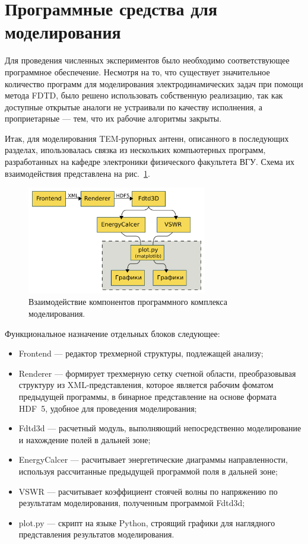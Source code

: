 
\section{Программные средства для моделирования}

Для проведения численных экспериментов было необходимо соответствующее
программное обеспечение. Несмотря на то, что существует значительное количество
программ для моделирования электродинамических задач при помощи метода FDTD,
было решено использовать собственную реализацию, так как доступные открытые
аналоги не устраивали по качеству исполнения, а проприетарные --- тем, что
их рабочие алгоритмы закрыты.

Итак, для моделирования TEM-рупорных антенн, описанного в последующих разделах,
ипользовалась связка из нескольких компьютерных программ, разработанных на
кафедре электроники физического факультета ВГУ. Схема их взаимодействия
представлена на рис.~\ref{fig:Programs:WorkFlow}.

\begin{figure}[p]
\centering
\includegraphics[width=0.7\textwidth]{graphics/programs-work-flow}
\caption{Взаимодействие компонентов программного комплекса моделирования.}
\label{fig:Programs:WorkFlow}
\end{figure}

Функциональное назначение отдельных блоков следующее:
\begin{itemize}
\item Frontend --- редактор трехмерной структуры, подлежащей анализу;
\item Renderer --- формирует трехмерную сетку счетной области, преобразовывая
      структуру из XML-представления, которое является рабочим фоматом
      предыдущей программы, в бинарное представление на основе формата HDF~5,
      удобное для проведения моделирования;
\item Fdtd3d --- расчетный модуль, выполняющий непосредственно моделирование
      и нахождение полей в дальней зоне;
\item EnergyCalcer --- расчитывает энергетические диаграммы направленности,
      используя рассчитанные предыдущей программой поля в дальней зоне;
\item VSWR --- расчитывает коэффициент стоячей волны по напряжению по
      результатам моделирования, полученным программой Fdtd3d;
\item plot.py --- скрипт на языке Python, строящий графики для наглядного
      представления результатов моделирования.
\end{itemize}

